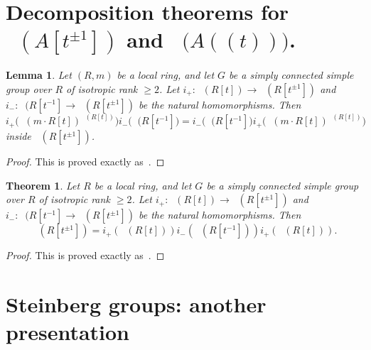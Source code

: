\documentclass[oneside,12pt]{amsart}
\newtheorem{thm}{Theorem}
\numberwithin{equation}{section}
\newtheorem{lem}{Lemma}
\numberwithin{lem}{section}
\theoremstyle{definition}
\theoremstyle{remark}
\DeclareMathOperator{\St}{St^G}
\begin{document}
\section{Decomposition theorems for \texorpdfstring{$\St(A[t^{\pm 1}])$}{St(A[t, t\textminussuperior\textonesuperior])} and \texorpdfstring{$\St\bigl(A((t))\bigr)$}{St(A((t)))}.}

\begin{lem}
 Let $(R,m)$ be a local ring, and let $G$ be a simply connected simple group over $R$
of isotropic rank $\ge 2$. Let $i_+:\St(R[t])\to\St(R[t^{\pm 1}])$ and $i_-:\St(R[t^{-1}]\to
\St(R[t^{\pm 1}])$ be the natural homomorphisms.
Then
$$
i_+\bigl(\St(m\cdot R[t])^{\St(R[t])}\bigr)i_-\bigl(\St(R[t^{-1}]\bigr)=i_-\bigl(\St(R[t^{-1}]\bigr)
i_+\bigl(\St(m\cdot R[t])^{\St(R[t])}\bigr)
$$
inside $\St(R[t^{\pm 1}])$.
\end{lem}
\begin{proof}
This is proved exactly as~\cite[Lemma 5.12]{St-poly}.
\end{proof}


\begin{thm}\label{thm:3t}
Let $R$ be a local ring, and let $G$ be a simply connected simple group over $R$
of isotropic rank $\ge 2$. Let $i_+:\St(R[t])\to\St(R[t^{\pm 1}])$ and $i_-:\St(R[t^{-1}]\to
\St(R[t^{\pm 1}])$ be the natural homomorphisms.
Then
$$
\St(R[t^{\pm 1}])=i_+(\St(R[t]))i_-(\St(R[t^{-1}]))i_+(\St(R[t])).
$$
\end{thm}
\begin{proof}
This is proved exactly as~\cite[Theorem 5.1]{St-poly}.
\end{proof}



\section{Steinberg groups: another presentation}
\end{document}
